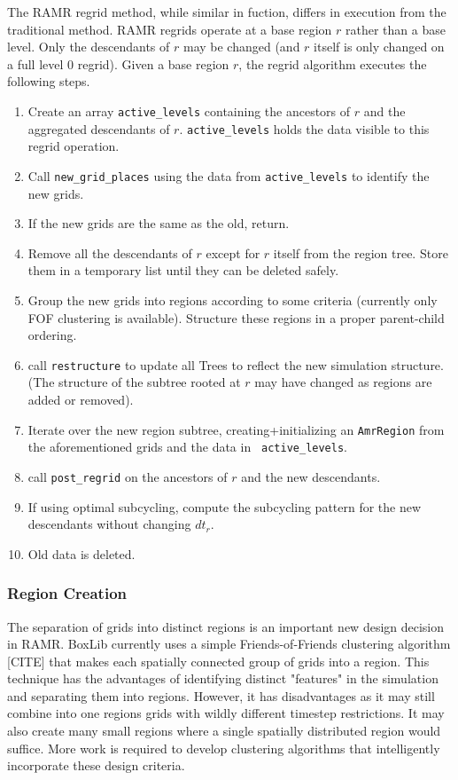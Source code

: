 \documentclass[11pt]{article}
\newcommand{\ben}{\begin{enumerate}}
\newcommand{\een}{\end{enumerate}}
\newcommand{\AR}{{\tt AmrRegion}}
\begin{document}
The RAMR regrid method, while similar in fuction, differs in 
execution from the traditional method. RAMR regrids operate at a 
base region $r$ rather than a base level. Only the descendants of $r$
may be changed (and $r$ itself is only changed on a full level 0 
regrid). Given a base region $r$, the regrid algorithm executes the 
following steps.
\ben
\item Create an array {\tt active\_levels} containing the ancestors of $r$ and 
the aggregated descendants of $r$. {\tt active\_levels} holds the data 
visible to this regrid operation.
\item Call {\tt new\_grid\_places} using the data from {\tt active\_levels}
to identify the new grids.
\item If the new grids are the same as the old, return.
\item Remove all the descendants of $r$ except for $r$ itself from the 
region tree. Store them in a temporary list until they can be deleted 
safely.
\item Group the new grids into regions according to some criteria 
(currently only FOF clustering is available). Structure these regions 
in a proper parent-child ordering.
\item call {\tt restructure} to update all Trees to reflect the new 
simulation structure. (The structure of the subtree rooted at $r$ may 
have changed as regions are added or removed).
\item Iterate over the new region subtree, creating+initializing 
an \AR{} from the aforementioned grids and the data in {\tt 
active\_levels}.
\item call {\tt post\_regrid} on the ancestors of $r$ and the new 
descendants. 
\item If using optimal subcycling, compute the subcycling pattern for 
the new descendants without changing $dt_r$.
\item Old data is deleted.
\een

\subsubsection{Region Creation}

The separation of grids into distinct regions is an important new 
design decision in RAMR. BoxLib currently uses a simple 
Friends-of-Friends clustering algorithm [CITE] that makes each 
spatially connected group of grids into a region. This technique has 
the advantages of identifying distinct "features" in the simulation 
and separating them into regions. However, it has disadvantages as 
it may still combine into one regions grids with wildly different 
timestep restrictions. It may also create many small regions where a 
single spatially distributed region would suffice. More work is 
required to develop clustering algorithms that intelligently 
incorporate these design criteria.
\end{document}
